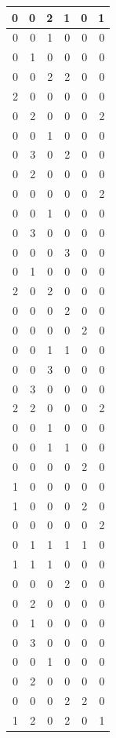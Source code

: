 \documentclass[
  12pt,
]{krantz}
\begin{document}
\begin{tabular}{r|r|r|r|r|r}
\hline
0 & 0 & 2 & 1 & 0 & 1\\
\hline
0 & 0 & 1 & 0 & 0 & 0\\
\hline
0 & 1 & 0 & 0 & 0 & 0\\
\hline
0 & 0 & 2 & 2 & 0 & 0\\
\hline
2 & 0 & 0 & 0 & 0 & 0\\
\hline
0 & 2 & 0 & 0 & 0 & 2\\
\hline
0 & 0 & 1 & 0 & 0 & 0\\
\hline
0 & 3 & 0 & 2 & 0 & 0\\
\hline
0 & 2 & 0 & 0 & 0 & 0\\
\hline
0 & 0 & 0 & 0 & 0 & 2\\
\hline
0 & 0 & 1 & 0 & 0 & 0\\
\hline
0 & 3 & 0 & 0 & 0 & 0\\
\hline
0 & 0 & 0 & 3 & 0 & 0\\
\hline
0 & 1 & 0 & 0 & 0 & 0\\
\hline
2 & 0 & 2 & 0 & 0 & 0\\
\hline
0 & 0 & 0 & 2 & 0 & 0\\
\hline
0 & 0 & 0 & 0 & 2 & 0\\
\hline
0 & 0 & 1 & 1 & 0 & 0\\
\hline
0 & 0 & 3 & 0 & 0 & 0\\
\hline
0 & 3 & 0 & 0 & 0 & 0\\
\hline
2 & 2 & 0 & 0 & 0 & 2\\
\hline
0 & 0 & 1 & 0 & 0 & 0\\
\hline
0 & 0 & 1 & 1 & 0 & 0\\
\hline
0 & 0 & 0 & 0 & 2 & 0\\
\hline
1 & 0 & 0 & 0 & 0 & 0\\
\hline
1 & 0 & 0 & 0 & 2 & 0\\
\hline
0 & 0 & 0 & 0 & 0 & 2\\
\hline
0 & 1 & 1 & 1 & 1 & 0\\
\hline
1 & 1 & 1 & 0 & 0 & 0\\
\hline
0 & 0 & 0 & 2 & 0 & 0\\
\hline
0 & 2 & 0 & 0 & 0 & 0\\
\hline
0 & 1 & 0 & 0 & 0 & 0\\
\hline
0 & 3 & 0 & 0 & 0 & 0\\
\hline
0 & 0 & 1 & 0 & 0 & 0\\
\hline
0 & 2 & 0 & 0 & 0 & 0\\
\hline
0 & 0 & 0 & 2 & 2 & 0\\
\hline
1 & 2 & 0 & 2 & 0 & 1\\

\end{tabular}
\end{document}
